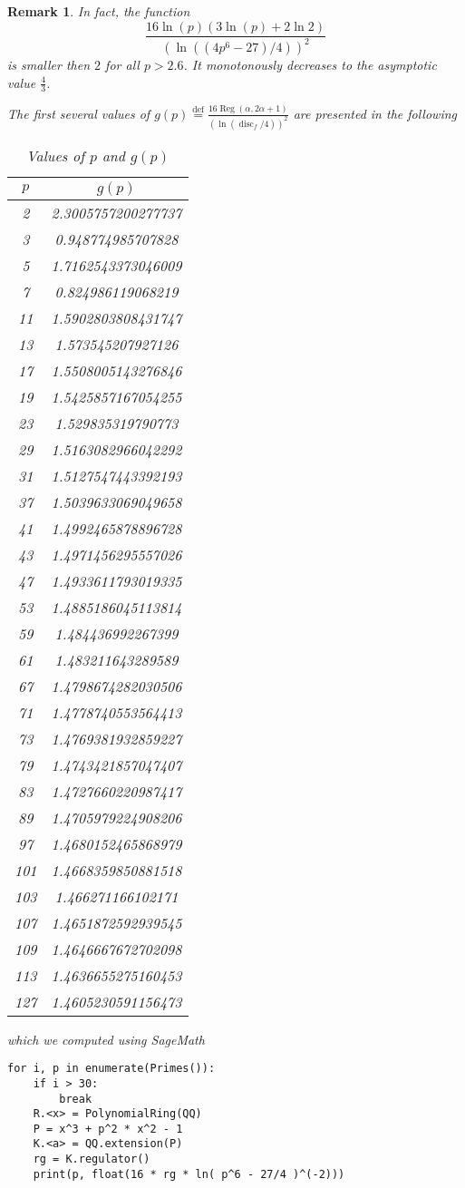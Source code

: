 \documentclass[a4paper]{article}
\newtheorem{Rem}[Thm]{Remark}
\newcommand{\eqdef}{\stackrel{\mathrm{def}}{=}}
\DeclareMathOperator{\Reg}{Reg}        %
\DeclareMathOperator{\disc}{disc}        %
\begin{document}
\begin{Rem}
In fact, the function
\[
\frac{16 
\ln(p) ( 3 \ln(p) + 2 \ln 2 )
}
{(\ln(
(4 p^6 - 27)
/4))^2} 
\] 
is smaller then $2$
for all $p > 2.6$.
It monotonously decreases to the asymptotic value $\frac{4}{3}$.

The first several values of $g(p) \eqdef 
\frac{16 \Reg(\alpha, 2\alpha + 1) }
{(\ln(\disc_f/4))^2} 
$ are presented in the following
\begin{table}[h!]
\centering
\begin{tabular}{|c|c|}
\hline
$p$ & $g(p)$ \\
\hline
2 & 2.3005757200277737 \\
3 & 0.948774985707828 \\
5 & 1.7162543373046009 \\
7 & 0.824986119068219 \\
11 & 1.5902803808431747 \\
13 & 1.573545207927126 \\
17 & 1.5508005143276846 \\
19 & 1.5425857167054255 \\
23 & 1.529835319790773 \\
29 & 1.5163082966042292 \\
31 & 1.5127547443392193 \\
37 & 1.5039633069049658 \\
41 & 1.4992465878896728 \\
43 & 1.4971456295557026 \\
47 & 1.4933611793019335 \\
53 & 1.4885186045113814 \\
59 & 1.484436992267399 \\
61 & 1.483211643289589 \\
67 & 1.4798674282030506 \\
71 & 1.4778740553564413 \\
73 & 1.4769381932859227 \\
79 & 1.4743421857047407 \\
83 & 1.4727660220987417 \\
89 & 1.4705979224908206 \\
97 & 1.4680152465868979 \\
101 & 1.4668359850881518 \\
103 & 1.466271166102171 \\
107 & 1.4651872592939545 \\
109 & 1.4646667672702098 \\
113 & 1.4636655275160453 \\
127 & 1.4605230591156473 \\
\hline
\end{tabular}
\caption{Values of $p$ and $g(p)$}
\label{table:gp}
\end{table}
\newpage
which we computed using SageMath
\begin{lstlisting}[style=sagemath, caption=SageMath code]
for i, p in enumerate(Primes()):
    if i > 30:
        break
    R.<x> = PolynomialRing(QQ)
    P = x^3 + p^2 * x^2 - 1
    K.<a> = QQ.extension(P)
    rg = K.regulator()
    print(p, float(16 * rg * ln( p^6 - 27/4 )^(-2)))
\end{lstlisting}
\end{Rem}
\end{document}
